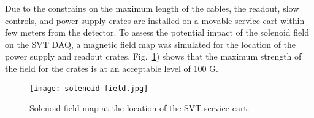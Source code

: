 Due to the constrains on the maximum length of the cables, the readout, slow controls, and power supply crates are installed on a movable service cart within few meters from the detector. To assess the potential impact of the solenoid field on the SVT DAQ, a magnetic field map was simulated for the location of the power supply and readout crates. Fig.~\ref{fig:solenoid-field}) shows that the maximum strength of the field for the crates is at an acceptable level of 100 G.

\begin{figure}[hbt] 
\centering 
\texttt{[image: solenoid-field.jpg]}
\caption{Solenoid field map at the location of the SVT service cart.}
\label{fig:solenoid-field}
\end{figure}




